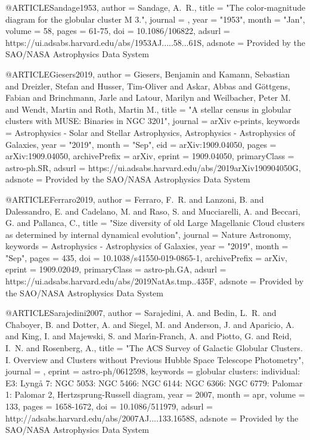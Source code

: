\documentclass[twocolumn,tighten]{aastex63}
\begin{document}
@ARTICLE{Sandage1953,
       author = {{Sandage}, A.~R.},
        title = "{The color-magnitude diagram for the globular cluster M 3.}",
      journal = {\aj},
         year = "1953",
        month = "Jan",
       volume = {58},
        pages = {61-75},
          doi = {10.1086/106822},
       adsurl = {https://ui.adsabs.harvard.edu/abs/1953AJ.....58...61S},
      adsnote = {Provided by the SAO/NASA Astrophysics Data System}
}

@ARTICLE{Giesers2019,
       author = {{Giesers}, Benjamin and {Kamann}, Sebastian and {Dreizler}, Stefan and
         {Husser}, Tim-Oliver and {Askar}, Abbas and {G{\"o}ttgens}, Fabian and
         {Brinchmann}, Jarle and {Latour}, Marilyn and {Weilbacher}, Peter M. and
         {Wendt}, Martin and {Roth}, Martin M.},
        title = "{A stellar census in globular clusters with MUSE: Binaries in NGC 3201}",
      journal = {arXiv e-prints},
     keywords = {Astrophysics - Solar and Stellar Astrophysics, Astrophysics - Astrophysics of Galaxies},
         year = "2019",
        month = "Sep",
          eid = {arXiv:1909.04050},
        pages = {arXiv:1909.04050},
archivePrefix = {arXiv},
       eprint = {1909.04050},
 primaryClass = {astro-ph.SR},
       adsurl = {https://ui.adsabs.harvard.edu/abs/2019arXiv190904050G},
      adsnote = {Provided by the SAO/NASA Astrophysics Data System}
}

@ARTICLE{Ferraro2019,
       author = {{Ferraro}, F.~R. and {Lanzoni}, B. and {Dalessandro}, E. and
         {Cadelano}, M. and {Raso}, S. and {Mucciarelli}, A. and {Beccari}, G. and
         {Pallanca}, C.},
        title = "{Size diversity of old Large Magellanic Cloud clusters as determined by internal dynamical evolution}",
      journal = {Nature Astronomy},
     keywords = {Astrophysics - Astrophysics of Galaxies},
         year = "2019",
        month = "Sep",
        pages = {435},
          doi = {10.1038/s41550-019-0865-1},
archivePrefix = {arXiv},
       eprint = {1909.02049},
 primaryClass = {astro-ph.GA},
       adsurl = {https://ui.adsabs.harvard.edu/abs/2019NatAs.tmp..435F},
      adsnote = {Provided by the SAO/NASA Astrophysics Data System}
}

 @ARTICLE{Sarajedini2007,
   author = {{Sarajedini}, A. and {Bedin}, L.~R. and {Chaboyer}, B. and {Dotter}, A. and 
	{Siegel}, M. and {Anderson}, J. and {Aparicio}, A. and {King}, I. and 
	{Majewski}, S. and {Mar{\'{\i}}n-Franch}, A. and {Piotto}, G. and 
	{Reid}, I.~N. and {Rosenberg}, A.},
    title = "{The ACS Survey of Galactic Globular Clusters. I. Overview and Clusters without Previous Hubble Space Telescope Photometry}",
  journal = {\aj},
   eprint = {astro-ph/0612598},
 keywords = {globular clusters: individual: E3: Lyng{\aa} 7: NGC 5053: NGC 5466: NGC 6144: NGC 6366: NGC 6779: Palomar 1: Palomar 2, Hertzsprung-Russell diagram},
     year = 2007,
    month = apr,
   volume = 133,
    pages = {1658-1672},
      doi = {10.1086/511979},
   adsurl = {http://adsabs.harvard.edu/abs/2007AJ....133.1658S},
  adsnote = {Provided by the SAO/NASA Astrophysics Data System}
}
 
\end{document}

